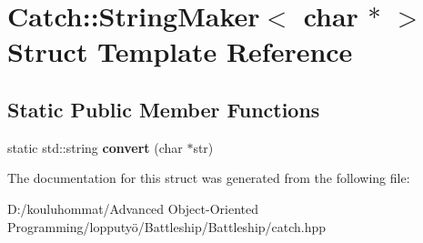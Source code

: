 \hypertarget{struct_catch_1_1_string_maker_3_01char_01_5_01_4}{}\section{Catch\+:\+:String\+Maker$<$ char $\ast$ $>$ Struct Template Reference}
\label{struct_catch_1_1_string_maker_3_01char_01_5_01_4}
\subsection*{Static Public Member Functions}
\begin{DoxyCompactItemize}
\item 
\mbox{\label{struct_catch_1_1_string_maker_3_01char_01_5_01_4_a33049e24281ea6fba48bd8817bdd52bd}} 
static std\+::string {\bfseries convert} (char $\ast$str)
\end{DoxyCompactItemize}


The documentation for this struct was generated from the following file\+:\begin{DoxyCompactItemize}
\item 
D\+:/kouluhommat/\+Advanced Object-\/\+Oriented Programming/lopputyö/\+Battleship/\+Battleship/catch.\+hpp\end{DoxyCompactItemize}
